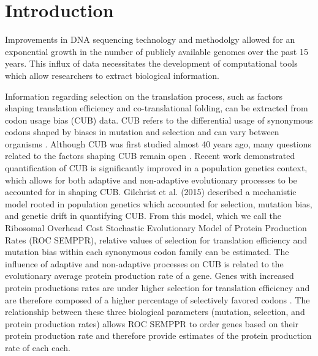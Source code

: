\documentclass{bioinfo}
\begin{document}
\section*{Introduction}
Improvements in DNA sequencing technology and methodolgy allowed for an exponential growth in the number of publicly available genomes over the past 15 years.
This influx of data necessitates the development of computational tools which allow researchers to extract biological information.

Information regarding selection on the translation process, such as factors shaping translation efficiency and co-translational folding, can be extracted from codon usage bias (CUB) data.
CUB refers to the differential usage of synonymous codons shaped by biases in mutation and selection and can vary between organisms \citep{bulmer1991, sharp1993}.
Although CUB was first studied almost 40 years ago, many questions related to the factors shaping CUB remain open \citep{shah2011, wallace2013, gilchrist2015}.
Recent work demonstrated quantification of CUB is significantly improved in a population genetics context, which allows for both adaptive and non-adaptive evolutionary processes to be accounted for in shaping CUB.
Gilchrist et al. (2015) described a mechanistic model rooted in population genetics which accounted for selection, mutation bias, and genetic drift in quantifying CUB. 
From this model, which we call the Ribosomal Overhead Cost Stochastic Evolutionary Model of Protein Production Rates (ROC SEMPPR), relative values of selection for translation efficiency and mutation bias within each synonymous codon family can be estimated. 
The influence of adaptive and non-adaptive processes on CUB is related to the evolutionary average protein production rate of a gene. Genes with increased protein productions rates are under higher selection for translation efficiency and are therefore composed of a higher percentage of selectively favored codons \citep{shah2011, wallace2013, gilchrist2015}. The relationship between these three biological parameters (mutation, selection, and protein production rates) allows ROC SEMPPR to order genes based on their protein production rate and therefore provide estimates of the protein production rate of each each. 
\end{document}
